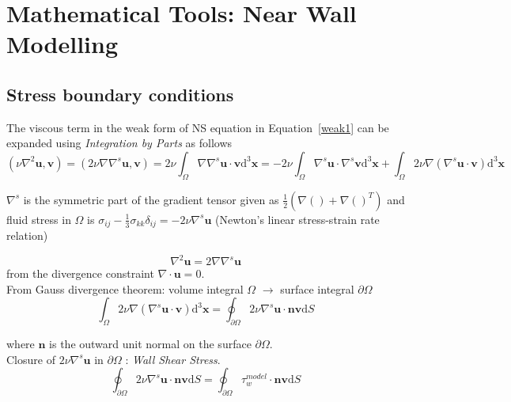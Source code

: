 
\chapter{Mathematical Tools: Near Wall Modelling} %

\label{AppendixB} %


\section{Stress boundary conditions}\label{stresseq}
The viscous term in the weak form of NS equation in Equation~\ref{weak1} can be expanded using \textit{Integration by Parts} as follows
\begin{equation}
\left(\nu \nabla^{2} \pmb{u}, \pmb{v}\right) = \left(2\nu \nabla \nabla^{s} \pmb{u}, \pmb{v}\right) = 2\nu\int_{\Omega}  \nabla \nabla^{s} \pmb{u} \cdot \pmb{v} \mathrm{d}^{3}\pmb{x} = -  2\nu\int_{\Omega}  \nabla^{s} \pmb{u} \cdot \nabla^{s} \pmb{v} \mathrm{d}^{3}\pmb{x} + \int_{\Omega} 2\nu \nabla \left(\nabla^{s} \pmb{u} \cdot \pmb{v}\right) \mathrm{d}^3\pmb{x}
\end{equation}

$\nabla^{s}$ is the symmetric part of the gradient tensor given as $\frac{1}{2}\left(\nabla () + \nabla ()^{T}\right)$ and fluid stress in $\Omega$ is $\sigma_{ij} - \frac{1}{3}\sigma_{kk}\delta_{ij} = -2\nu \nabla^{s} \pmb{u}$ (Newton's linear stress-strain rate relation)

$$\nabla^{2} \pmb{u} = 2\nabla \nabla^s \pmb{u}$$ from the divergence constraint $\nabla \cdot \pmb{u} = 0$. \\
From Gauss divergence theorem: volume integral $\Omega$ $\rightarrow$ surface integral $\partial \Omega$
\begin{equation}
\int_{\Omega}2\nu \nabla \left(\nabla^{s} \pmb{u} \cdot \pmb{v}\right) \mathrm{d}^3\pmb{x} =  \oint_{\partial \Omega} 2\nu \nabla^{s} \pmb{u} \cdot \pmb{n} \pmb{v} \mathrm{d}S
\end{equation}


where $\pmb{n}$ is the outward unit normal on the surface $\partial \Omega$.\\

Closure of $2\nu \nabla^{s}  \pmb{u}$ in $\partial \Omega$ : \textit{ Wall Shear Stress}.
\begin{equation}
\boxed{\oint_{\partial \Omega} 2\nu \nabla^{s} \pmb{u} \cdot \pmb{n} \pmb{v} \mathrm{d}S = \oint_{\partial \Omega} \tau_{w}^{model} \cdot \pmb{n} \pmb{v} \mathrm{d}S}
\end{equation}
 

